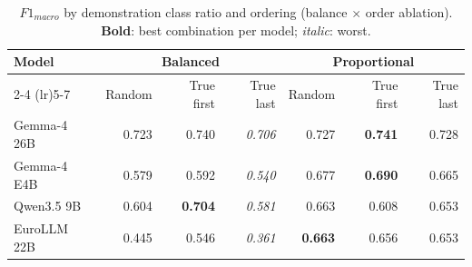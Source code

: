 \begin{table}[t]
\centering
\caption{$F1_{macro}$ by demonstration class ratio and ordering (balance $\times$ order ablation). \textbf{Bold}: best combination per model; \textit{italic}: worst.}
\label{tab:ablation-balance-order}
\small
\setlength{\tabcolsep}{4pt}
\begin{tabular}{lrrrrrr}
\toprule
Model & \multicolumn{3}{c}{Balanced} & \multicolumn{3}{c}{Proportional} \\
\cmidrule(lr){2-4} \cmidrule(lr){5-7}
 & Random & True first & True last & Random & True first & True last \\
\midrule
Gemma-4 26B & 0.723 & 0.740 & \textit{0.706} & 0.727 & \textbf{0.741} & 0.728 \\
Gemma-4 E4B & 0.579 & 0.592 & \textit{0.540} & 0.677 & \textbf{0.690} & 0.665 \\
Qwen3.5 9B & 0.604 & \textbf{0.704} & \textit{0.581} & 0.663 & 0.608 & 0.653 \\
EuroLLM 22B & 0.445 & 0.546 & \textit{0.361} & \textbf{0.663} & 0.656 & 0.653 \\
\bottomrule
\end{tabular}
\end{table}